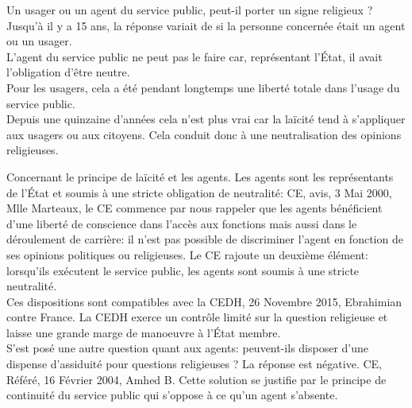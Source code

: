 \documentclass[10pt, a4paper, openany]{book}
\begin{document}
Un usager ou un agent du service public, peut-il porter un signe religieux ? Jusqu'à il y a 15 ans, la réponse variait de si la personne concernée était un agent ou un usager. \\
L'agent du service public ne peut pas le faire car, représentant l'État, il avait l'obligation d'être neutre. \\
Pour les usagers, cela a été pendant longtemps une liberté totale dans l'usage du service public. \\
Depuis une quinzaine d'années cela n'est plus vrai car la laïcité tend à s'appliquer aux usagers ou aux citoyens. Cela conduit donc à une neutralisation des opinions religieuses. 


Concernant le principe de laïcité et les agents. Les agents sont les représentants de l'État et soumis à une stricte obligation de neutralité: CE, avis, 3 Mai 2000, Mlle Marteaux, le CE commence par nous rappeler que les agents bénéficient d'une liberté de conscience dans l'accès aux fonctions mais aussi dans le déroulement de carrière: il n'est pas possible de discriminer l'agent en fonction de ses opinions politiques ou religieuses. Le CE rajoute un deuxième élément: lorsqu'ils exécutent le service public, les agents sont soumis à une stricte neutralité. \\
Ces dispositions sont compatibles avec la CEDH, 26 Novembre 2015, Ebrahimian contre France. La CEDH exerce un contrôle limité sur la question religieuse et laisse une grande marge de manoeuvre à l'État membre. \\
S'est posé une autre question quant aux agents: peuvent-ils disposer d'une dispense d'assiduité pour questions religieuses ? La réponse est négative. CE, Référé, 16 Février 2004, Amhed B. Cette solution se justifie par le principe de continuité du service public qui s'oppose à ce qu'un agent s'absente. 
\end{document}
